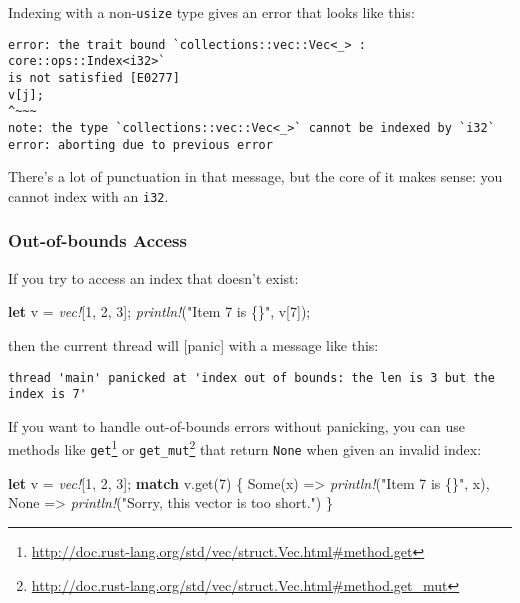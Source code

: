 \documentclass[a4paper,]{book}
\newenvironment{Shaded}{\begin{snugshade}}{\end{snugshade}}
\newcommand{\KeywordTok}[1]{\textcolor[rgb]{0.13,0.29,0.53}{\textbf{{#1}}}}
\newcommand{\DecValTok}[1]{\textcolor[rgb]{0.00,0.00,0.81}{{#1}}}
\newcommand{\ConstantTok}[1]{\textcolor[rgb]{0.00,0.00,0.00}{{#1}}}
\newcommand{\StringTok}[1]{\textcolor[rgb]{0.31,0.60,0.02}{{#1}}}
\newcommand{\PreprocessorTok}[1]{\textcolor[rgb]{0.56,0.35,0.01}{\textit{{#1}}}}
\newcommand{\NormalTok}[1]{{#1}}
\renewcommand{\href}[2]{#2\footnote{\url{#1}}}
\begin{document}
Indexing with a non-\texttt{usize} type gives an error that looks like
this:

\begin{verbatim}
error: the trait bound `collections::vec::Vec<_> : core::ops::Index<i32>`
is not satisfied [E0277]
v[j];
^~~~
note: the type `collections::vec::Vec<_>` cannot be indexed by `i32`
error: aborting due to previous error
\end{verbatim}

There's a lot of punctuation in that message, but the core of it makes
sense: you cannot index with an \texttt{i32}.

\subsubsection{Out-of-bounds Access}\label{out-of-bounds-access}

If you try to access an index that doesn't exist:

\begin{Shaded}
\begin{Highlighting}[]
\KeywordTok{let} \NormalTok{v = }\PreprocessorTok{vec!}\NormalTok{[}\DecValTok{1}\NormalTok{, }\DecValTok{2}\NormalTok{, }\DecValTok{3}\NormalTok{];}
\PreprocessorTok{println!}\NormalTok{(}\StringTok{"Item 7 is \{\}"}\NormalTok{, v[}\DecValTok{7}\NormalTok{]);}
\end{Highlighting}
\end{Shaded}

then the current thread will {[}panic{]} with a message like this:

\begin{verbatim}
thread 'main' panicked at 'index out of bounds: the len is 3 but the index is 7'
\end{verbatim}

If you want to handle out-of-bounds errors without panicking, you can
use methods like
\href{http://doc.rust-lang.org/std/vec/struct.Vec.html\#method.get}{\texttt{get}}
or
\href{http://doc.rust-lang.org/std/vec/struct.Vec.html\#method.get_mut}{\texttt{get\_mut}}
that return \texttt{None} when given an invalid index:

\begin{Shaded}
\begin{Highlighting}[]
\KeywordTok{let} \NormalTok{v = }\PreprocessorTok{vec!}\NormalTok{[}\DecValTok{1}\NormalTok{, }\DecValTok{2}\NormalTok{, }\DecValTok{3}\NormalTok{];}
\KeywordTok{match} \NormalTok{v.get(}\DecValTok{7}\NormalTok{) \{}
    \ConstantTok{Some}\NormalTok{(x) => }\PreprocessorTok{println!}\NormalTok{(}\StringTok{"Item 7 is \{\}"}\NormalTok{, x),}
    \ConstantTok{None} \NormalTok{=> }\PreprocessorTok{println!}\NormalTok{(}\StringTok{"Sorry, this vector is too short."}\NormalTok{)}
\NormalTok{\}}
\end{Highlighting}
\end{Shaded}
\end{document}
